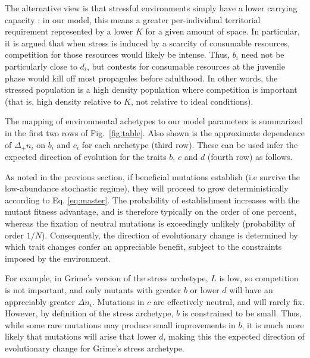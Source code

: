 \documentclass[11pt]{article}
\begin{document}
The alternative view is that stressful environments simply have a lower carrying capacity \citep{taylor_1990}; in our model, this means a greater per-individual territorial requirement represented by a lower $K$ for a given amount of space. In particular, it is argued that when stress is induced by a scarcity of consumable resources, competition for those resources would likely be intense. Thus, $b_i$ need not be particularly close to $d_i$, but contests for consumable resources at the juvenile phase would kill off most propagules before adulthood. In other words, the stressed population is a high density population where competition is important \citep{taylor_1990} (that is, high density relative to $K$, not relative to ideal conditions). 

The mapping of environmental achetypes to our model parameters is summarized in the first two rows of Fig.~\ref{fig:table}. Also shown is the approximate dependence of $\Delta_+ n_i$ on $b_i$ and $c_i$ for each archetype (third row). These can be used infer the expected direction of evolution for the traits $b$, $c$ and $d$ (fourth row) as follows. 

As noted in the previous section, if beneficial mutations establish (i.e survive the low-abundance stochastic regime), they will proceed to grow deterministically according to Eq. \eqref{eq:master}. The probability of establishment increases with the mutant fitness advantage, and is therefore typically on the order of one percent, whereas the fixation of neutral mutations is exceedingly unlikely (probability of order $1/N$). Consequently, the direction of evolutionary change is determined by which trait changes confer an appreciable benefit, subject to the constraints imposed by the environment. 

For example, in Grime's version of the stress archetype, $L$ is low, so competition is not important, and only mutants with greater $b$ or lower $d$ will have an appreciably greater $\Delta n_i$. Mutations in $c$ are effectively neutral, and will rarely fix. However, by definition of the stress archetype, $b$ is constrained to be small. Thus, while some rare mutations may produce small improvements in $b$, it is much more likely that mutations will arise that lower $d$, making this the expected direction of evolutionary change for Grime's stress archetype. 
\end{document}
